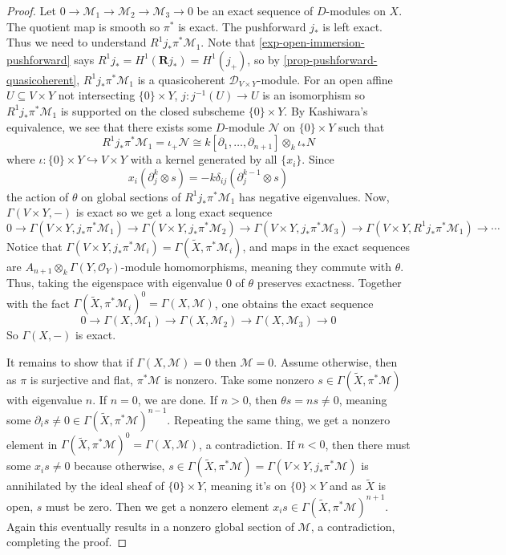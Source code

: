 \documentclass[11pt, a4paper]{article}
\theoremstyle{definition}
\newcommand{\dR}{\mathbf{R}}
\begin{document}
\begin{proof}
        Let $0\to \mathcal M_1\to\mathcal M_2\to\mathcal M_3\to 0$ be an exact sequence of $D$-modules on $X$. The quotient map is smooth so $\pi^*$ is exact. The pushforward $j_*$ is left exact. Thus we need to understand $R^1j_*\pi^*\mathcal M_1$. Note that \cref{exp-open-immersion-pushforward} says $R^1j_*=H^1(\dR j_*)=H^1(j_+)$, so by \cref{prop-pushforward-quasicoherent}, $R^1j_*\pi^*\mathcal M_1$ is a quasicoherent $\mathcal D_{V\times Y}$-module. For an open affine $U\subseteq V\times Y$ not intersecting $\{0\}\times Y$, $j:j^{-1}(U)\to U$ is an isomorphism so $R^1j_*\pi^*\mathcal M_1$ is supported on the closed subscheme $\{0\}\times Y$. By Kashiwara's equivalence, we see that there exists some $D$-module $\mathcal N$ on $\{0\}\times Y$ such that
        \[R^1j_*\pi^*\mathcal M_1=\iota_+\mathcal N\cong k[\partial_1,\dots,\partial_{n+1}]\otimes_k\mathcal \iota_*N\]
        where $\iota:\{0\}\times Y\hookrightarrow V\times Y$ with a kernel generated by all $\{x_i\}$. Since
        \[x_i(\partial_j^{k}\otimes s)=-k\delta_{ij}(\partial_j^{k-1}\otimes s)\]
        the action of $\theta$ on global sections of $R^1j_*\pi^*\mathcal M_1$ has negative eigenvalues. Now, $\Gamma(V\times Y, -)$ is exact so we get a long exact sequence
        \[0\to\Gamma(V\times Y,j_*\pi^*\mathcal M_1)\to \Gamma(V\times Y,j_*\pi^*\mathcal M_2)\to\Gamma(V\times Y,j_*\pi^*\mathcal M_3)\to\Gamma(V\times Y,R^1j_*\pi^*\mathcal M_1)\to\cdots\]
        Notice that $\Gamma(V\times Y,j_*\pi^*\mathcal M_i)=\Gamma(\tilde X,\pi^*\mathcal M_i)$, and maps in the exact sequences are $A_{n+1}\otimes_k\Gamma(Y,\mathcal O_Y)$-module homomorphisms, meaning they commute with $\theta$. Thus, taking the eigenspace with eigenvalue $0$ of $\theta$ preserves exactness. Together with the fact $\Gamma(\tilde X,\pi^*\mathcal M_i)^0=\Gamma(X, \mathcal M)$, one obtains the exact sequence
        \[0\to \Gamma(X, \mathcal M_1)\to \Gamma(X, \mathcal M_2)\to \Gamma(X, \mathcal M_3)\to 0\]
        So $\Gamma(X, -)$ is exact.

        It remains to show that if $\Gamma(X, \mathcal M)=0$ then $\mathcal M=0$. Assume otherwise, then as $\pi$ is surjective and flat, $\pi^*\mathcal M$ is nonzero. Take some nonzero $s\in\Gamma(\widetilde X, \pi^*\mathcal M)$ with eigenvalue $n$. If $n=0$, we are done. If $n>0$, then $\theta s=ns\neq 0$, meaning some $\partial_is\neq 0\in\Gamma(\widetilde X, \pi^*\mathcal M)^{n-1}$. Repeating the same thing, we get a nonzero element in $\Gamma(\widetilde X, \pi^*\mathcal M)^0=\Gamma(X,\mathcal M)$, a contradiction. If $n<0$, then there must some $x_is\neq 0$ because otherwise, $s\in\Gamma(\widetilde X, \pi^*\mathcal M)=\Gamma(V\times Y, j_*\pi^*\mathcal M)$ is annihilated by the ideal sheaf of $\{0\}\times Y$, meaning it's on $\{0\}\times Y$ and as $\tilde X$ is open, $s$ must be zero. Then we get a nonzero element $x_is\in \Gamma(\widetilde X, \pi^*\mathcal M)^{n+1}$. Again this eventually results in a nonzero global section of $\mathcal M$, a contradiction, completing the proof.
    \end{proof}
\end{document}
